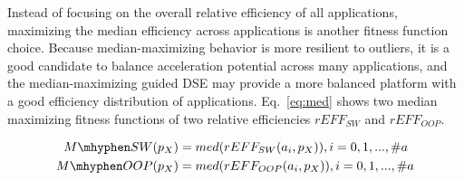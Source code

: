 Instead of focusing on the overall relative efficiency of all applications, maximizing the median efficiency across applications is another fitness function choice. 
Because median-maximizing behavior is more resilient to outliers, it is a good candidate to balance acceleration potential across many applications, and the median-maximizing guided DSE may provide a more balanced platform with a good efficiency distribution of applications. 
Eq.~\eqref{eq:med} shows two median maximizing fitness functions of two relative efficiencies $rEFF_{SW}$ and $rEFF_{OOP}$. 

\vspace{-4pt}
\begin{equation}
\begin{split}
	M\mhyphen SW (p_{X}) &= med(rEFF_{SW}(a_{i}, p_{X})),   i = 0,1,...,\#a \\
	M\mhyphen OOP (p_{X}) &= med(rEFF_{OOP}(a_{i}, p_{X})), i = 0,1,...,\#a
\label{eq:med}
\end{split}
\end{equation}